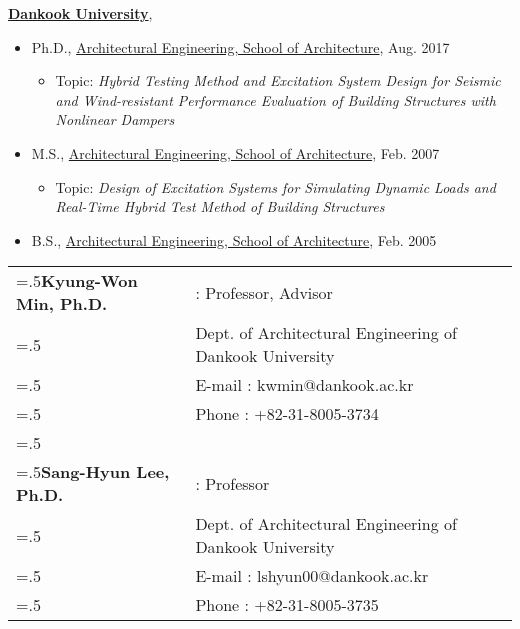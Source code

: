 \nocite{*}
\href{http://www.dankook.ac.kr/}{\textbf{Dankook University}},
\begin{itemize}[label=]
	\item Ph.D., \href{http://cms.dankook.ac.kr/web/archi} {Architectural Engineering, School of Architecture}, Aug. 2017
	      \begin{itemize}
		      \item Topic: \emph{Hybrid Testing Method and Excitation System Design for Seismic and Wind-resistant Performance Evaluation of Building Structures with Nonlinear Dampers}
	      \end{itemize}

	\item M.S., \href{http://cms.dankook.ac.kr/web/archi} {Architectural Engineering, School of Architecture}, Feb. 2007
	      \begin{itemize}
		      \item Topic: \emph{Design of Excitation Systems for Simulating Dynamic Loads and Real-Time Hybrid Test Method of Building Structures}
	      \end{itemize}
	\item B.S., \href{http://cms.dankook.ac.kr/web/archi}{Architectural Engineering, School of Architecture}, Feb. 2005
\end{itemize}


\begin{table}[htbp]
	\begin{tabularx}{1.8\textwidth}{>{\hsize=.5\hsize}XX}
		\textbf{Kyung-Won Min, Ph.D.} & : Professor, Advisor                                     \\
		                              & Dept. of Architectural Engineering of Dankook University \\
		                              & E-mail : kwmin@dankook.ac.kr                             \\
		                              & Phone : +82-31-8005-3734                                 \\\\
		\textbf{Sang-Hyun Lee, Ph.D.} & : Professor                                              \\
		                              & Dept. of Architectural Engineering of Dankook University \\
		                              & E-mail : lshyun00@dankook.ac.kr                          \\
		                              & Phone : +82-31-8005-3735                                 \\
	\end{tabularx}
\end{table}